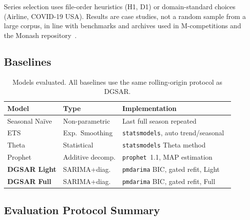 \documentclass[sn-mathphys-num,pdflatex]{sn-jnl}
\begin{document}
Series selection uses file-order heuristics (H1, D1) or
domain-standard choices (Airline, COVID-19 USA). Results are
case studies, not a random sample from a large corpus, in line with
benchmarks and archives used in M-competitions and the Monash
repository~\cite{makridakis2020m4, makridakis2022m5, godahewa2021monash}.

\subsection{Baselines}

\begin{table}[ht]
\caption{Models evaluated. All baselines use the same rolling-origin
protocol as DGSAR.}
\label{tab:baselines}
\centering
\small
\begin{tabular}{@{}llp{4.2cm}@{}}
\toprule
\textbf{Model} & \textbf{Type} & \textbf{Implementation} \\
\midrule
Seasonal Na\"{i}ve & Non-parametric & Last full season repeated \\
ETS & Exp.\ Smoothing & \texttt{statsmodels}, auto trend/seasonal~\cite{gardner2006exp} \\
Theta & Statistical & \texttt{statsmodels} Theta method~\cite{assimakopoulos2000theta} \\
Prophet & Additive decomp. & \texttt{prophet}~1.1, MAP estimation~\cite{taylor2018forecasting, abbasimehr2024hybrid} \\
\textbf{DGSAR Light} & SARIMA+diag. & \texttt{pmdarima} BIC, gated refit, Light~\cite{pmdarima} \\
\textbf{DGSAR Full} & SARIMA+diag. & \texttt{pmdarima} BIC, gated refit, Full \\
\bottomrule
\end{tabular}
\end{table}

\subsection{Evaluation Protocol Summary}
\end{document}
